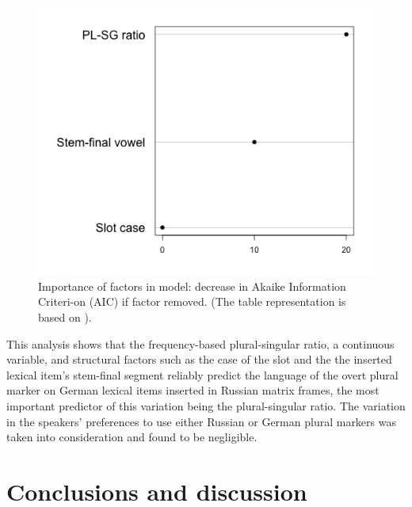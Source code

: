 \begin{figure}
\includegraphics[scale=0.5]{figures/6-Figure_5.png}
\caption{Importance of factors in model: decrease in Akaike Information Criteri-on (AIC) if factor removed. (The table representation is based on \citealt{szmrecsanyi-2013}).\label{fig:6:5}}
\end{figure}

This analysis shows that the frequency-based plural-singular ratio, a continuous variable, and structural factors such as the case of the slot and the the inserted lexical item’s stem-final segment  reliably predict the language of the overt plural marker on German lexical items inserted in Russian matrix frames, the most important predictor of this variation being the plural-singular ratio. The variation in the speakers' preferences to use either Russian or German plural markers was taken into consideration and found to be negligible.

\section{Conclusions and discussion}



